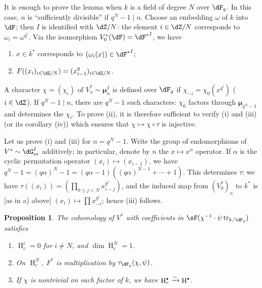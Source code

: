 \documentclass[oneside]{book}
\DeclareMathOperator{\h}{H}
\DeclareMathOperator{\tr}{tr}
\newcommand{\dmu}{{\bm\mu}}
\newcounter{char}
\newcommand{\iso}{\xrightarrow\sim}
\theoremstyle{sga-source}
\theoremstyle{sga-source-dash}
\theoremstyle{sga-source-dotdash}
\theoremstyle{sga-source-number-note-dash}
\theoremstyle{sga-source-note-number-dotdash}
\theoremstyle{sga-source-example-dotdash}
\theoremstyle{sga-source-inline-number}
\theoremstyle{sga-source-bare-number}
\theoremstyle{sga-source}
\newtheorem{proposition_}[subsection]{Proposition}
\let\oldbullet\bullet
\renewcommand{\bullet}{\textnormal{\tiny$\oldbullet$}}
\newcommand{\PrintPage}[1]{}\newcommand{\MathPage}[1]{}\newcommand{\PrintCite}[2]{#1}\newcommand{\var}[3]{#2}
\begin{document}
It is enough to prove the lemma when $k$ is a field of degree $N$ over 
$\dF_q$. In this case, $n$ is ``sufficiently divisible'' if $q^N-1\mid n$. 
Choose \var{an embedding $\omega$ of $k$ into $\dF_q$}{an embedding $\omega$ of $k$ into $\dF$}{S45-SOL-0820}; then $I$ is identified 
with $\dZ/N$: the element $i\in \dZ/N$ corresponds to $\omega_i=\omega^{q^i}$. Via 
the isomorphism $V_0^\ast(\dF) = {\dF^\ast}^I$, we have 
\begin{enumerate}[\indent a)]
  \item $x\in k^\ast$ corresponds to $(\omega_i(x))\in {\dF^\ast}^I$; 
  \item $F((x_i)_{i\in \dZ/N})=(x_{i-1}^q)_{i\in \dZ/N}$. 
\end{enumerate}

\PrintPage{201}
A character $\chi=(\chi_i)$ of $V_n^\ast\sim \dmu_n^I$ is defined over 
$\dF_q$ if $\chi_{-i} =\chi_0(x^{q^i})$ ($i\in \dZ$). If $q^N-1\mid n$, there are 
$q^N-1$ such characters: $\chi_0$ factors through $\dmu_{q^N-1}$ and 
determines the $\chi_i$. To prove (ii), it is therefore sufficient to verify (i) 
and (iii) (or its corollary (iv)) which ensures that $\chi\mapsto \chi\circ \tau$ 
is injective. 

Let us prove (i) and (iii) for $n=q^N-1$. Write the group of 
endomorphisms of $V^\ast\sim \dG_m^I$ additively; in particular, denote by $n$ 
the $x\mapsto x^n$ operator. If $\alpha$ is the cyclic permutation operator 
$(x_i)\mapsto (x_{i-1})$, we have 
$q^N-1=(q\alpha)^N-1 = (q\alpha-1)((q\alpha)^{N-1}+\cdots + 1)$. This 
determines $\tau$: we have $\tau((x_i)) = (\prod_{0\leqslant j<N} x_{i-j}^{q^j})$, 
and the induced map from $(V_0^\ast)_n$ to $k^\ast$ is [as in a) above] 
$(x_i)\mapsto \prod x_{-i}^{q^i}$; hence (iii) follows. 





\begin{proposition_}\label{VI:4-10}
The cohomology of $V^\ast$ with coefficients in 
$\sF(\chi^{-1}\cdot \psi\tr_{k/\dF_q})$ satisfies 
\begin{enumerate}[\indent (i)]
  \item $\h_c^i = 0$ for $i\ne N$, and $\dim \h_c^N=1$. 
  \item On $\h_c^N$, $F^\ast$ is multiplication by 
    $\tau_{\dF_q}(\chi,\psi)$. 
  \item If $\chi$ is nontrivial on each factor of $k$, we have 
    $\h_c^\bullet \iso \h^\bullet$. 
\end{enumerate}
\end{proposition_}
\end{document}
